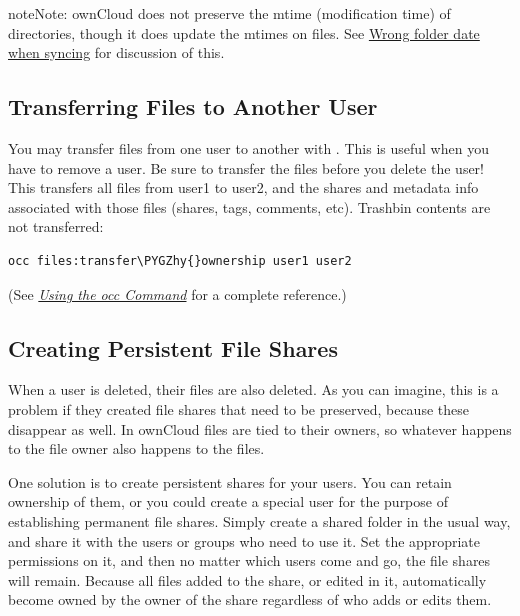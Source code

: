 \documentclass[letterpaper,10pt,english]{sphinxmanual}
\def\PYGZhy{\char`\-}
\begin{document}
\begin{notice}{note}{Note:}
ownCloud does not preserve the mtime (modification time) of
directories, though it does update the mtimes on files. See
\href{https://github.com/owncloud/core/issues/7009}{Wrong folder date when syncing} for discussion of this.
\end{notice}


\subsection{Transferring Files to Another User}
\label{configuration_files/file_sharing_configuration:transferring-files-to-another-user}\label{configuration_files/file_sharing_configuration:transfer-userfiles-label}
You may transfer files from one user to another with . This is useful
when you have to remove a user. Be sure to transfer the files before you delete
the user!  This transfers all files from user1 to user2, and the shares and
metadata info associated with those files (shares, tags, comments, etc).
Trashbin contents are not transferred:

\begin{Verbatim}[commandchars=\\\{\}]
occ files:transfer\PYGZhy{}ownership user1 user2
\end{Verbatim}

(See {\hyperref[configuration_server/occ_command::doc]{\emph{Using the occ Command}}} for a complete 
reference.)


\subsection{Creating Persistent File Shares}
\label{configuration_files/file_sharing_configuration:creating-persistent-file-shares}
When a user is deleted, their files are also deleted. As you can imagine, this
is a problem if they created file shares that need to be preserved, because
these disappear as well. In ownCloud files are tied to their owners, so
whatever happens to the file owner also happens to the files.

One solution is to create persistent shares for your users. You can retain
ownership of them, or you could create a special user for the purpose of
establishing permanent file shares. Simply create a shared folder in the usual
way, and share it with the users or groups who need to use it. Set the
appropriate permissions on it, and then no matter which users come and go, the
file shares will remain. Because all files added to the share, or edited in it,
automatically become owned by the owner of the share regardless of who adds or
edits them.
\end{document}
